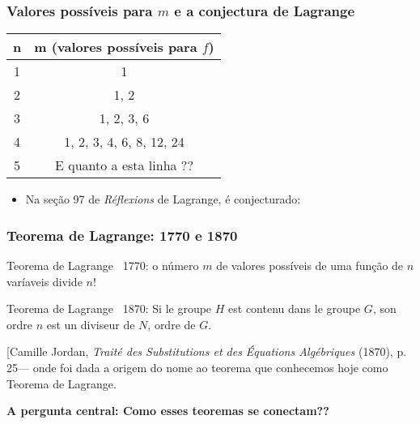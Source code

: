 \documentclass{beamer}
\begin{document}
\begin{frame}
\frametitle{Valores possíveis para $m$ e a conjectura de Lagrange}
\begin{center}
\begin{tabular}{|c|c|}
\hline
\textbf{n} & \textbf{m (valores possíveis para $f$)} \\
\hline
1 &  1 \\
\hline 
2 &  1, 2 \\
\hline
3 &  1, 2, 3, 6 \\
\hline
4 & 1, 2, 3, 4, 6, 8, 12, 24 \\
\hline
5 &  {\color{red} E quanto a esta linha ??}\\
\hline
\end{tabular}
\end{center}

\begin{itemize}
\item Na seção 97 de \textit{Réflexions} de Lagrange, é conjecturado:
\end{itemize}

\begin{center}
\end{center}
\end{frame}

\begin{frame}
\frametitle{Teorema de Lagrange: 1770 e 1870}
\fontsize{15}{16}\selectfont
\begin{justify}

{\color{blue} Teorema de Lagrange ~1770:} o número $m$ de valores possíveis de uma função de $n$ varíaveis divide $n!$

\vspace{0.7cm}


{\color{blue} Teorema de Lagrange ~1870:} Si le groupe $H$ est contenu dans le
groupe $G$, son ordre $n$ est un diviseur de $N$, ordre de $G$. 

[{\color{green}Camille Jordan,} \textit{Traité des Substitutions et des Équations Algébriques} (1870), p. 25— onde foi dada a origem do nome ao teorema que conhecemos hoje como Teorema de Lagrange.

\vspace{0.7cm}

\textbf{{\color{blue} A pergunta central:} Como esses teoremas se conectam??}

\end{justify}

\end{frame}
\end{document}
